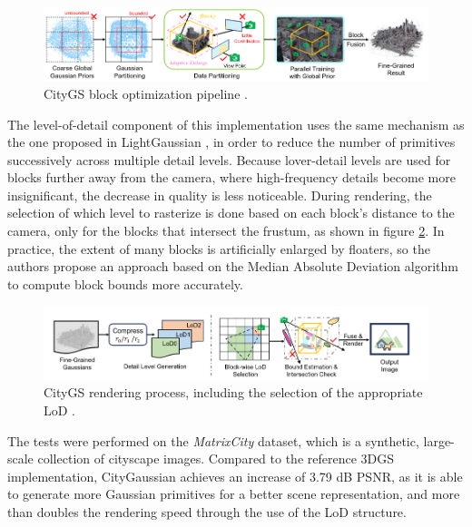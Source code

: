 \begin{figure}[H]
    \centering
    \includegraphics[width=0.8\linewidth]{figures/citygs_training.png}
    \caption{CityGS block optimization pipeline \cite{liu2024citygaussian}.}
    \label{fig:city_training}
\end{figure}

The level-of-detail component of this implementation uses the same mechanism as the one proposed in LightGaussian \cite{fan2023lightgaussian}, in order to reduce the number of primitives successively across multiple detail levels. Because lover-detail levels are used for blocks further away from the camera, where high-frequency details become more insignificant, the decrease in quality is less noticeable. During rendering, the selection of which level to rasterize is done based on each block's distance to the camera, only for the blocks that intersect the frustum, as shown in figure \ref{fig:city_render}. In practice, the extent of many blocks is artificially enlarged by floaters, so the authors propose an approach based on the Median Absolute Deviation algorithm \cite{dodge2008concise} to compute block bounds more accurately.

\begin{figure}[H]
    \centering
    \includegraphics[width=0.8\linewidth]{figures/citygs_rendering.png}
    \caption{CityGS rendering process, including the selection of the appropriate LoD \cite{liu2024citygaussian}.}
    \label{fig:city_render}
\end{figure}

The tests were performed on the \textit{MatrixCity} \cite{li2023matrixcity} dataset, which is a synthetic, large-scale collection of cityscape images. Compared to the reference 3DGS implementation, CityGaussian achieves an increase of 3.79 dB PSNR, as it is able to generate more Gaussian primitives for a better scene representation, and more than doubles the rendering speed through the use of the LoD structure. 


